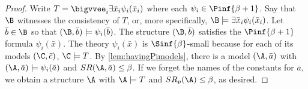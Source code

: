 \documentclass{amsart}
\renewcommand{\-}{\text{-}}
\begin{document}
\havingSigmamodels

\begin{proof}
Write $T=\bigvvee_{i}\exists \bar x_i\psi_i(\bar x_i)$ where each $\psi_i\in\Pinf{\beta+1}$.
Say that $\B$ witnesses the consistency of $T$, or, more specifically, $\B\models \exists \bar x_i\psi_i(\bar x_i)$.
Let $\bar b\in \B$ so that $(\B,\bar b)\models \psi_i(\bar b)$.
The structure $(\B,\bar b)$ satisfies the $\Pinf{\beta+1}$ formula $\psi_i(\bar x)$.
The theory $\psi_i(\bar x)$ is $\Sinf{\beta}$-small because for each of its models $(\C,\bar{c})$, $\C\models T$.
By \cref{lem:havingPimodels}, there is a model $(\A,\bar a)$ with $(\A,\bar a)\models \psi_i(\bar a)$ and $SR(\A,\bar a)\leq \beta$.
If we forget the names of the constants for $\bar a$, we obtain a structure $\A$ with $\A\models T$ and $SR_p(\A)\leq \beta$, as desired.
\end{proof}
\end{document}
